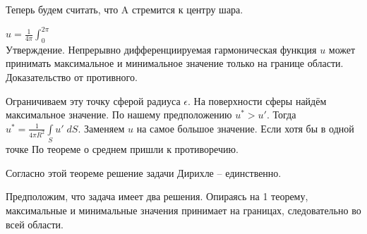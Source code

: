 Теперь будем считать, что A стремится к центру шара.

$u = \frac{1}{4 \pi} \int_0^{2 \pi}$\\

Утверждение. 
Непрерывно дифференциируемая гармоническая функция $u$ может принимать максимальное и минимальное значение только на границе области.
Доказательство от противного.

Ограничиваем эту точку сферой радиуса $\epsilon$. На поверхности сферы найдём максимальное значение. По нашему предположению $u^* > u'$. Тогда $u^* = \frac{1}{4 \pi R^2} \int\limits_S u'\; dS$. Заменяем $u$ на самое большое значение. Если хотя бы в одной точке 
По теореме о среднем пришли к противоречию.

Согласно 
этой теореме решение задачи Дирихле -- единственно.

Предположим, что задача имеет два решения.
Опираясь на 1 теорему, максимальные и минимальные значения принимает на границах, следовательно во всей области.